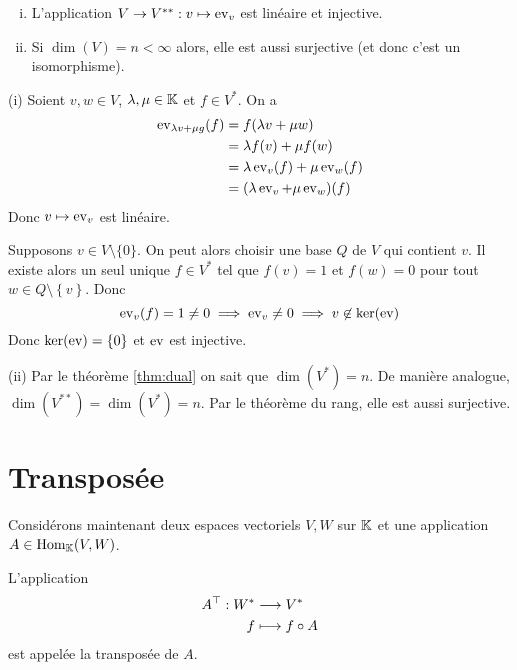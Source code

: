\begin{theoreme}[Bidual]
  \begin{enumerate}[(i)]
    \item L'application $V \rightarrow V^{**} : v \mapsto \operatorname{ev}_v$ est linéaire et injective.
    \item Si $\dim(V) = n < \infty$ alors, elle est aussi surjective (et donc c'est un isomorphisme).
  \end{enumerate}

  \tcblower
  \begin{preuve}
    (i) Soient $v,w \in V$, $\lambda, \mu \in \mathbb{K}$ et $f \in V^*$. On a
    \begin{align*}
      \operatorname{ev}_{\lambda v + \mu g}(f) &= f(\lambda v + \mu w) \\
                                 &= \lambda f(v) + \mu f(w) \\
                                 &= \lambda\operatorname{ev}_v(f) + \mu\operatorname{ev}_w(f) \\
                                 &= (\lambda\operatorname{ev}_v + \mu\operatorname{ev}_w)(f)
    \end{align*}
    Donc $v\mapsto \operatorname{ev}_v$ est linéaire.
    \par Supposons $v \in V \setminus \{ 0 \}$. On peut alors choisir une base $Q$ de $V$ qui contient $v$. Il existe alors un seul unique $f \in V^*$ tel que $f(v) = 1$ et  $f(w) = 0$ pour tout  $w \in Q \setminus \left\{ v \right\}$. Donc
    $$\operatorname{ev}_v(f) = 1 \not = 0 \implies \operatorname{ev}_v \not = 0 \implies v \not \in \ker(\operatorname{ev})$$
    Donc $\ker(\operatorname{ev}) = \left\{ 0 \right\}$ et $\operatorname{ev}$ est injective.
    \par (ii) Par le théorème \ref{thm:dual} on sait que $\dim(V^*) = n$. De manière analogue, $\dim(V^{**}) = \dim(V^*) = n$. Par le théorème du rang, elle est aussi surjective.
  \end{preuve}
\end{theoreme}

\section{Transposée}
Considérons maintenant deux espaces vectoriels $V,W $ sur  $\mathbb{K}$ et une application $A \in \mathrm{Hom}_{\mathbb{K}}(V, W)$.
\begin{definition}
  L'application
  \begin{align*}
    A^\top : W^* &\longrightarrow V^* \\
    f&\longmapsto f \circ A
  \end{align*}
  est appelée la transposée de $A$.
\end{definition}

